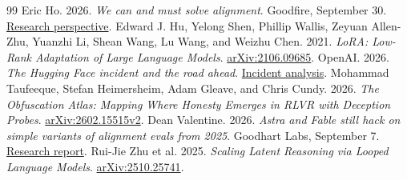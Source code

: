 \begin{thebibliography}{99}
 Eric Ho. 2026. \emph{We can and must solve alignment}. Goodfire, September 30. \href{https://www.goodfire.com/blog/we-can-and-must-solve-alignment}{Research perspective}.
 Edward J. Hu, Yelong Shen, Phillip Wallis, Zeyuan Allen-Zhu, Yuanzhi Li, Shean Wang, Lu Wang, and Weizhu Chen. 2021. \emph{LoRA: Low-Rank Adaptation of Large Language Models}. \href{https://arxiv.org/abs/2106.09685}{arXiv:2106.09685}.
 OpenAI. 2026. \emph{The Hugging Face incident and the road ahead}. \href{https://openai.com/index/hugging-face-incident-and-the-road-ahead/}{Incident analysis}.
 Mohammad Taufeeque, Stefan Heimersheim, Adam Gleave, and Chris Cundy. 2026. \emph{The Obfuscation Atlas: Mapping Where Honesty Emerges in RLVR with Deception Probes}. \href{https://arxiv.org/abs/2602.15515v2}{arXiv:2602.15515v2}.
 Dean Valentine. 2026. \emph{Astra and Fable still hack on simple variants of alignment evals from 2025}. Goodhart Labs, September 7. \href{https://goodhartlabs.com/blog/frontier-models-still-hack-alignment-evals}{Research report}.
 Rui-Jie Zhu et al. 2025. \emph{Scaling Latent Reasoning via Looped Language Models}. \href{https://arxiv.org/abs/2510.25741}{arXiv:2510.25741}.
\end{thebibliography}

